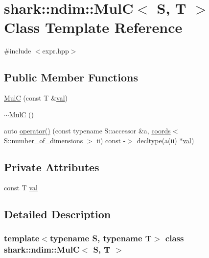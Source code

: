 \hypertarget{classshark_1_1ndim_1_1_mul_c}{}\section{shark\+:\+:ndim\+:\+:MulC$<$ S, T $>$ Class Template Reference}
\label{classshark_1_1ndim_1_1_mul_c}


{\ttfamily \#include $<$expr.\+hpp$>$}

\subsection*{Public Member Functions}
\begin{DoxyCompactItemize}
\item 
\hyperlink{classshark_1_1ndim_1_1_mul_c_aea6eccffd6c63cc792714e48c9dc1c9e}{MulC} (const T \&\hyperlink{classshark_1_1ndim_1_1_mul_c_adf2e920c0c3a31d93f551ba6d75170cd}{val})
\item 
\hyperlink{classshark_1_1ndim_1_1_mul_c_a045d8909667e5ccf881459f35119b74e}{$\sim$\+MulC} ()
\item 
auto \hyperlink{classshark_1_1ndim_1_1_mul_c_a81f80d754e0c9852bcf6ce4f58a55c64}{operator()} (const typename S\+::accessor \&a, \hyperlink{structshark_1_1ndim_1_1coords}{coords}$<$ S\+::number\+\_\+of\+\_\+dimensions $>$ ii) const -\/$>$ decltype(a(ii) $\ast$\hyperlink{classshark_1_1ndim_1_1_mul_c_adf2e920c0c3a31d93f551ba6d75170cd}{val})
\end{DoxyCompactItemize}
\subsection*{Private Attributes}
\begin{DoxyCompactItemize}
\item 
const T \hyperlink{classshark_1_1ndim_1_1_mul_c_adf2e920c0c3a31d93f551ba6d75170cd}{val}
\end{DoxyCompactItemize}


\subsection{Detailed Description}
\subsubsection*{template$<$typename S, typename T$>$\newline
class shark\+::ndim\+::\+Mul\+C$<$ S, T $>$}

